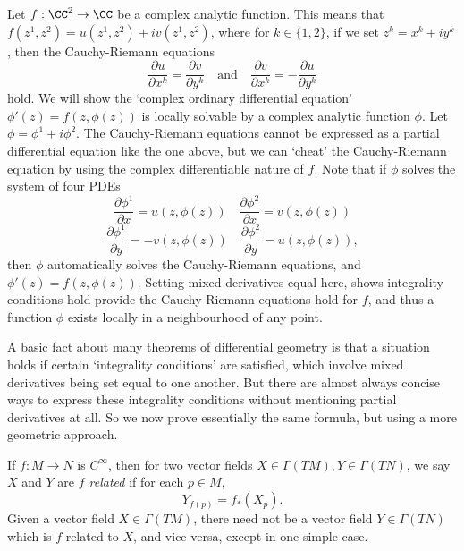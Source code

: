 \begin{example}
    Let $f: \CC^2 \to \CC$ be a complex analytic function. This means that $f(z^1,z^2) = u(z^1,z^2) + iv(z^1,z^2)$, where for $k \in \{ 1, 2 \}$, if we set $z^k = x^k + i y^k$, then the Cauchy-Riemann equations
    \[ \frac{\partial u}{\partial x^k} = \frac{\partial v}{\partial y^k} \quad\text{and}\quad \frac{\partial v}{\partial x^k} = - \frac{\partial u}{\partial y^k} \]
    hold. We will show the `complex ordinary differential equation' $\phi'(z) = f(z,\phi(z))$ is locally solvable by a complex analytic function $\phi$. Let $\phi = \phi^1 + i \phi^2$. The Cauchy-Riemann equations cannot be expressed as a partial differential equation like the one above, but we can `cheat' the Cauchy-Riemann equation by using the complex differentiable nature of $f$. Note that if $\phi$ solves the system of four PDEs
    \[ \frac{\partial \phi^1}{\partial x} = u(z,\phi(z)) \quad \frac{\partial \phi^2}{\partial x} = v(z,\phi(z)) \]
    \[ \frac{\partial \phi^1}{\partial y} = -v(z,\phi(z)) \quad \frac{\partial \phi^2}{\partial y} = u(z,\phi(z)), \]
    then $\phi$ automatically solves the Cauchy-Riemann equations, and $\phi'(z) = f(z,\phi(z))$. Setting mixed derivatives equal here, shows integrality conditions hold provide the Cauchy-Riemann equations hold for $f$, and thus a function $\phi$ exists locally in a neighbourhood of any point.
\end{example}

A basic fact about many theorems of differential geometry is that a situation holds if certain `integrality conditions' are satisfied, which involve mixed derivatives being set equal to one another. But there are almost always concise ways to express these integrality conditions without mentioning partial derivatives at all. So we now prove essentially the same formula, but using a more geometric approach.

If $f:M \to N$ is $C^\infty$, then for two vector fields $X \in \Gamma(TM), Y \in \Gamma(TN)$, we say $X$ and $Y$ are \emph{$f$ related} if for each $p \in M$,
%
\[ Y_{f(p)} = f_*(X_p). \]
%
Given a vector field $X \in \Gamma(TM)$, there need not be a vector field $Y \in \Gamma(TN)$ which is $f$ related to $X$, and vice versa, except in one simple case.

